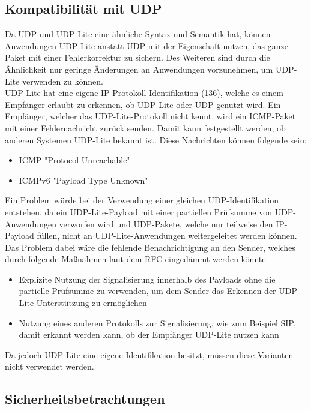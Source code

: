 \documentclass{template}
\begin{document}
\subsection{Kompatibilität mit UDP}

Da UDP und UDP-Lite eine ähnliche Syntax und Semantik hat,
können Anwendungen UDP-Lite anstatt UDP mit der
Eigenschaft nutzen, das ganze Paket mit einer Fehlerkorrektur zu
sichern. Des Weiteren sind durch die Ähnlichkeit nur geringe
Änderungen an Anwendungen vorzunehmen, um UDP-Lite verwenden zu können.\\

UDP-Lite hat eine eigene IP-Protokoll-Identifikation (136),
welche es einem Empfänger erlaubt zu erkennen, ob UDP-Lite oder UDP genutzt wird.
Ein Empfänger, welcher das UDP-Lite-Protokoll nicht kennt, wird ein
ICMP-Paket mit einer Fehlernachricht zurück senden.
Damit kann festgestellt werden, ob anderen Systemen UDP-Lite bekannt ist.
Diese Nachrichten können folgende sein:
\begin{itemize}
\item ICMP "Protocol Unreachable"
\item ICMPv6 "Payload Type Unknown"
\end{itemize}

Ein Problem würde bei der Verwendung einer gleichen UDP-Identifikation
entstehen, da ein UDP-Lite-Payload mit einer partiellen Prüfsumme
von UDP-Anwendungen verworfen wird und UDP-Pakete, welche nur teilweise
den IP-Payload füllen, nicht an UDP-Lite-Anwendungen weitergeleitet werden können.
Das Problem dabei wäre die fehlende Benachrichtigung an den Sender,
welches durch folgende Maßnahmen laut dem RFC eingedämmt werden könnte:
\begin{itemize}
\item Explizite Nutzung der Signalisierung innerhalb des Payloads
		ohne die partielle Prüfsumme zu verwenden, um dem Sender das
		Erkennen der UDP-Lite-Unterstützung zu ermöglichen
\item Nutzung eines anderen Protokolls zur Signalisierung,
		wie zum Beispiel SIP, damit erkannt werden kann,
		ob der Empfänger UDP-Lite nutzen kann
\end{itemize}

Da jedoch UDP-Lite eine eigene Identifikation besitzt,
müssen diese Varianten nicht verwendet werden.


\subsection{Sicherheitsbetrachtungen}
\end{document}
